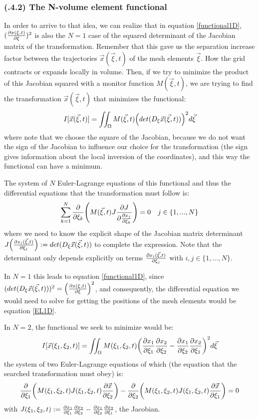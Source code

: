 \documentclass[11pt, a4paper]{article} %
\begin{document}
\subsubsection*{\bf (\textgamma.4.2) The N-volume element functional}
In order to arrive to that idea, we can realize that in equation \eqref{functional1D}, $(\pdv{x(\xi,t)}{\xi})^2$ is also the $N=1$ case of the squared determinant of the Jacobian matrix of the transformation. Remember that this gave us the separation increase factor between the trajectories $\vec{x}(\vec{\xi},t)$ of the mesh elements $\vec{\xi}$. How the grid contracts or expands locally in volume. Then, if we try to minimize the product of this Jacobian squared with a monitor function $M(\vec{\xi},t)$, we are trying to find the transformation $\vec{x}(\vec{\xi},t)$ that minimizes the functional:
\begin{equation}
I[\vec{x}(\vec{\xi},t)]=\iint_\Omega M(\vec{\xi},t) \qty(det(D_\xi \vec{x}(\vec{\xi},t)))^2 d\vec{\xi}
\end{equation}
where note that we choose the square of the Jacobian, because we do not want the sign of the Jacobian to influence our choice for the transformation (the sign gives information about the local inversion of the coordinates), and this way the functional can have a minimum.

The system of $N$ Euler-Lagrange equations of this functional and thus the differential equations that the transformation must follow is:
\begin{equation}
\sum_{k=1}^N \pdv{}{\xi_k} \qty( M(\vec{\xi},t) J \pdv{J }{\pdv{x_j}{\xi_k}} )=0\quad j\in\{1,...,N\}
\end{equation}
where we need to know the explicit shape of the Jacobian matrix determinant $J\qty(\pdv{x_i(\vec{\xi},t)}{\xi_j}):=det(D_\xi \vec{x}(\vec{\xi},t))$ to complete the expression. Note that the determinant only depends explicitly on terms $\pdv{x_i(\vec{\xi},t)}{\xi_j}$ with $i,j\in\{1,...,N\}$.

In $N=1$ this leads to equation \eqref{functional1D}, since $(det(D_\xi \vec{x}(\vec{\xi},t)))^2=\qty(\pdv{x(\xi,t)}{\xi})^2$, and consequently, the differential equation we would need to solve for getting the positions of the mesh elements would be equation \eqref{EL1D}.

In $N=2$, the functional we seek to minimize would be:
\begin{equation}
I[\vec{x}(\xi_1,\xi_2 ,t)]=\iint_\Omega M(\xi_1, \xi_2,t) \qty( \pdv{x_1}{\xi_1}\pdv{x_2}{\xi_2} - \pdv{x_1}{\xi_2} \pdv{x_2}{\xi_1})^2 d\vec{\xi}
\end{equation}
the system of two Euler-Lagrange equations of which (the equation that the searched transformation must obey) is:
\begin{equation}
\pdv{}{\xi_1}\qty(M(\xi_1,\xi_2,t)J(\xi_1,\xi_2,t)\pdv{\vec{x}}{\xi_2})-\pdv{}{\xi_2}\qty(M(\xi_1,\xi_2,t)J(\xi_1,\xi_2,t)\pdv{\vec{x}}{\xi_1})=0
\end{equation}
with $J(\xi_1,\xi_2,t):=\pdv{x_1}{\xi_1}\pdv{x_2}{\xi_2} - \pdv{x_1}{\xi_2} \pdv{x_2}{\xi_1}$, the Jacobian.
\end{document}
